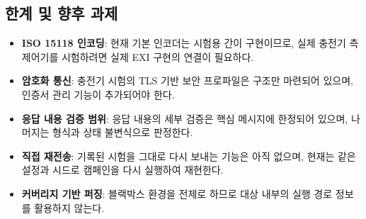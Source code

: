 \subsection{한계 및 향후 과제}

\begin{itemize}
    \item \textbf{ISO 15118 인코딩}: 현재 기본 인코더는 시험용 간이 구현이므로, 실제 충전기 측 제어기를 시험하려면 실제 EXI 구현의 연결이 필요하다.
    \item \textbf{암호화 통신}: 충전기 시험의 TLS 기반 보안 프로파일은 구조만 마련되어 있으며, 인증서 관리 기능이 추가되어야 한다.
    \item \textbf{응답 내용 검증 범위}: 응답 내용의 세부 검증은 핵심 메시지에 한정되어 있으며, 나머지는 형식과 상태 불변식으로 판정한다.
    \item \textbf{직접 재전송}: 기록된 시험을 그대로 다시 보내는 기능은 아직 없으며, 현재는 같은 설정과 시드로 캠페인을 다시 실행하여 재현한다.
    \item \textbf{커버리지 기반 퍼징}: 블랙박스 환경을 전제로 하므로 대상 내부의 실행 경로 정보를 활용하지 않는다.
\end{itemize}
